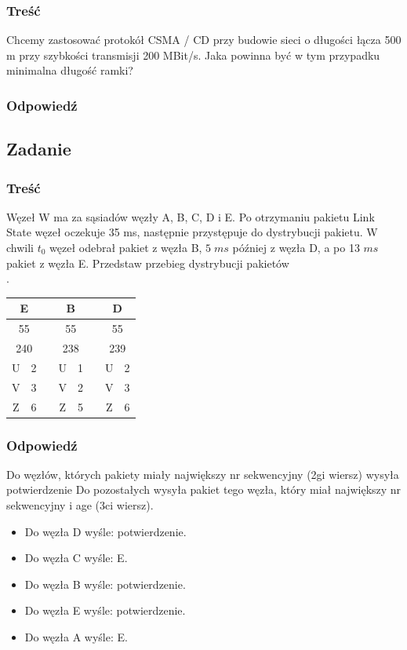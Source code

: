 		\subsubsection{Treść}
			Chcemy zastosować protokół CSMA / CD przy budowie sieci o długości łącza 500 m przy szybkości transmisji 200 MBit/s. Jaka powinna być w tym przypadku minimalna długość ramki?
		\subsubsection{Odpowiedź}
	\subsection{Zadanie}
		\subsubsection{Treść}
			Węzeł W ma za sąsiadów węzły A, B, C, D i E. Po otrzymaniu pakietu Link State węzeł oczekuje 35 ms, następnie przystępuje do dystrybucji pakietu. W chwili $ t_0 $ węzeł odebrał pakiet z węzła B, $ 5\;ms $ później z węzła D, a po 13 $ ms $ pakiet z węzła E. Przedstaw przebieg dystrybucji pakietów\\.
			\begin{tabular}{|c|c|c|c|c|c|c|c|}
				\hline \multicolumn{2}{|c|}{\textbf{E}}  & & \multicolumn{2}{|c|}{\textbf{B}} & & \multicolumn{2}{|c|}{\textbf{D}}\\ 
				\hline \multicolumn{2}{|c|}{55} & &\multicolumn{2}{|c|}{55} & &\multicolumn{2}{|c|}{55} \\ 
				\hline \multicolumn{2}{|c|}{240} & &\multicolumn{2}{|c|}{238} & &\multicolumn{2}{|c|}{239}   \\ 
				\hline U & 2 & & U & 1 & & U & 2\\ 
				\hline V & 3 & & V & 2 & & V & 3\\
				\hline Z & 6 & & Z & 5 & & Z & 6\\
				\hline 
			\end{tabular}
		\subsubsection{Odpowiedź}
			Do węzłów, których pakiety miały największy nr sekwencyjny (2gi wiersz) wysyła potwierdzenie
			Do pozostałych wysyła pakiet tego węzła, który miał największy nr sekwencyjny i age (3ci wiersz).
			\begin{itemize}
				\item Do węzła D wyśle: potwierdzenie.
				\item Do węzła C wyśle: E.
				\item Do węzła B wyśle: potwierdzenie.
				\item Do węzła E wyśle: potwierdzenie.
				\item Do węzła A wyśle: E.
			\end{itemize}
	
